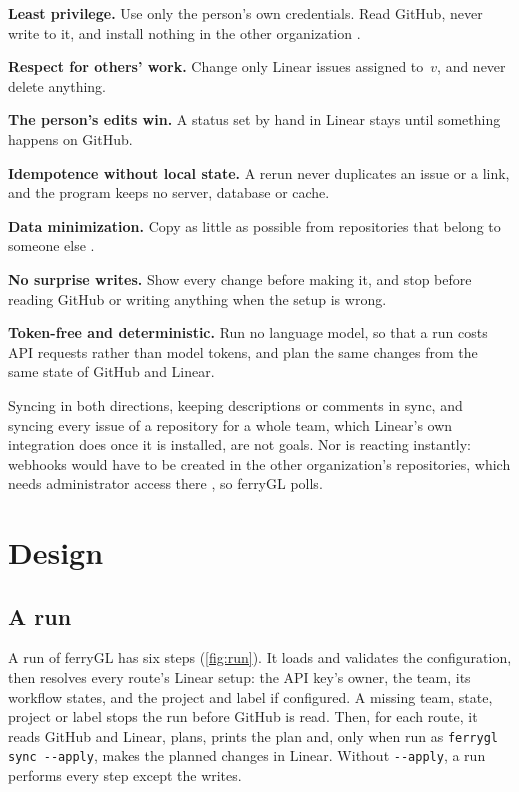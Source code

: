\documentclass[11pt,a4paper]{article}
\newcommand{\ferry}{ferryGL}
\newcommand{\code}[1]{\texttt{#1}}
\newcommand{\opt}[1]{\texttt{-{}-#1}}
\begin{document}
\begin{description}[leftmargin=2.2em, style=sameline, font=\normalfont\bfseries]
  \item[R1] \textbf{Least privilege.} Use only the person's own credentials. Read GitHub,
    never write to it, and install nothing in the other organization
    \cite{saltzer1975protection}.
  \item[R2] \textbf{Respect for others' work.} Change only Linear issues assigned to~$v$, and
    never delete anything.
  \item[R3] \textbf{The person's edits win.} A status set by hand in Linear stays until
    something happens on GitHub.
  \item[R4] \textbf{Idempotence without local state.} A rerun never duplicates an issue or a
    link, and the program keeps no server, database or cache.
  \item[R5] \textbf{Data minimization.} Copy as little as possible from repositories that
    belong to someone else \cite{europeanunion2016gdpr}.
  \item[R6] \textbf{No surprise writes.} Show every change before making it, and stop before
    reading GitHub or writing anything when the setup is wrong.
  \item[R7] \textbf{Token-free and deterministic.} Run no language model, so that a run costs
    API requests rather than model tokens, and plan the same changes from the same state of
    GitHub and Linear.
\end{description}

\noindent Syncing in both directions, keeping descriptions or comments in sync, and syncing
every issue of a repository for a whole team, which Linear's own integration does once it is
installed, are not goals. Nor is reacting instantly: webhooks would have to be created in the
other organization's repositories, which needs administrator access there
\cite{github2026webhooks}, so \ferry{} polls.

\section{Design}
\label{sec:design}

\subsection{A run}

A run of \ferry{} has six steps (\cref{fig:run}). It loads and validates the configuration,
then resolves every route's Linear setup: the API key's owner, the team, its workflow states,
and the project and label if configured. A missing team, state, project or label stops the run
before GitHub is read. Then, for each route, it reads GitHub and Linear, plans, prints the plan
and, only when run as \code{ferrygl sync \opt{apply}}, makes the planned changes in Linear.
Without \opt{apply}, a run performs every step except the writes.
\end{document}
